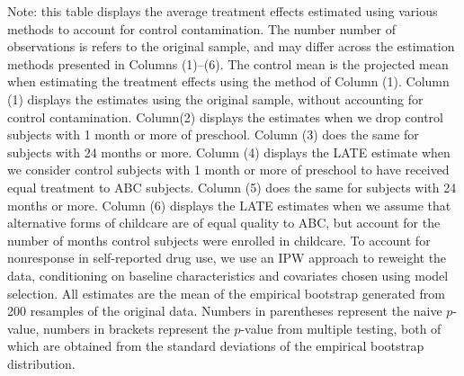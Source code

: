 \begin{table}[H]
\begin{threeparttable}
\begin{tabular}{cccccccccc}
  \hline\hline
  \end{tabular}
    \begin{tablenotes}
    \scriptsize
    \item 
Note: this table displays the average treatment effects estimated using various methods to
account for control contamination. The number number of observations is refers to the 
original sample, and may differ across the estimation methods presented in Columns (1)--(6). 
The control mean is the projected mean when estimating the treatment 
effects using the method of Column (1). Column (1) displays the estimates using the original
sample, without accounting for control contamination. 
Column(2) displays the estimates when we drop control subjects with 1 month or more of preschool.
Column (3) does the same for subjects with 24 months or more. Column (4) displays the LATE
estimate when we consider control subjects with 1 month or more of preschool to have received
equal treatment to ABC subjects. Column (5) does the same for subjects with 24 months or more.
Column (6) displays the LATE estimates when we assume that alternative forms of childcare
are of equal quality to ABC, but account for the number of months control subjects were
enrolled in childcare. To account for nonresponse in self-reported drug use, we use an IPW approach to reweight the data,
conditioning on baseline characteristics and covariates chosen using model selection. 
All estimates are the mean of the empirical bootstrap generated 
from 200 resamples of the original data. Numbers in parentheses represent the naive $p$-value,
numbers in brackets represent the $p$-value from multiple testing, both of which are obtained from 
the standard deviations of the empirical bootstrap distribution.

    \end{tablenotes}
  \end{threeparttable}

\end{table}